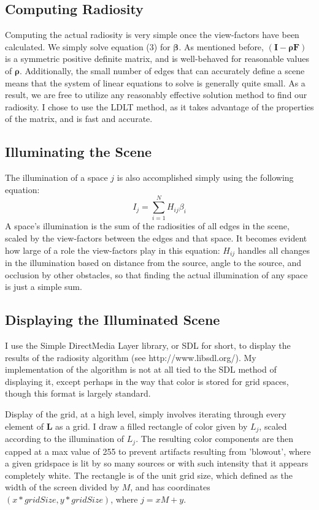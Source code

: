 \documentclass[letter]{article}
\newcommand{\vect}[1]{\boldsymbol{#1}}
\begin{document}
\subsection{Computing Radiosity}
Computing the actual radiosity is very simple once the view-factors have been calculated. We simply solve equation (3) for $\vect{\beta}$. As mentioned before, $(\vect{I}-\vect{\rho F})$ is a symmetric positive definite matrix, and is well-behaved for reasonable values of $\vect{\rho}$. Additionally, the small number of edges that can accurately define a scene means that the system of linear equations to solve is generally quite small. As a result, we are free to utilize any reasonably effective solution method to find our radiosity. I chose to use the LDLT method, as it takes advantage of the properties of the matrix, and is fast and accurate.

\subsection{Illuminating the Scene}
The illumination of a space $j$ is also accomplished simply using the following equation:
\begin{equation}
I_j = \sum_{i=1}^{N} H_{ij} \beta_{i}
\end{equation}
A space's illumination is the sum of the radiosities of all edges in the scene, scaled by the view-factors between the edges and that space. It becomes evident how large of a role the view-factors play in this equation: $H_{ij}$ handles all changes in the illumination based on distance from the source, angle to the source, and occlusion by other obstacles, so that finding the actual illumination of any space is just a simple sum.

\subsection{Displaying the Illuminated Scene}
I use the Simple DirectMedia Layer library, or SDL for short, to display the results of the radiosity algorithm (see http://www.libsdl.org/). My implementation of the algorithm is not at all tied to the SDL method of displaying it, except perhaps in the way that color is stored for grid spaces, though this format is largely standard.

Display of the grid, at a high level, simply involves iterating through every element of $\vect{L}$ as a grid. I draw a filled rectangle of color given by $L_j$, scaled according to the illumination of $L_j$. The resulting color components are then capped at a max value of 255 to prevent artifacts resulting from 'blowout', where a given gridspace is lit by so many sources or with such intensity that it appears completely white. The rectangle is of the unit grid size, which defined as the width of the screen divided by $M$, and has coordinates $(x * gridSize, y * gridSize)$, where $j=xM+y$.
\end{document}
